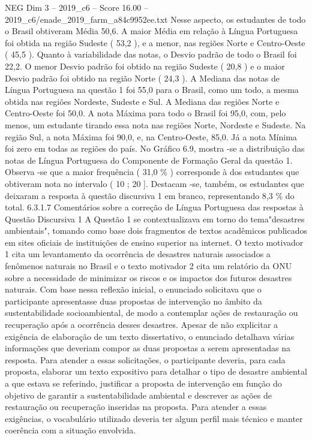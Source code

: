 \begin{textsample}{NEG Dim 3 – 2019\_c6 – Score 16.00 – 2019\_c6/enade\_2019\_farm\_a84c9952ee.txt}
Nesse aspecto, os estudantes de todo o Brasil obtiveram Média 50,6.
A maior Média em relação à Língua Portuguesa foi obtida na região Sudeste ( 53,2 ), e a menor, nas regiões Norte e Centro-Oeste ( 45,5 ).
Quanto à variabilidade das notas, o Desvio padrão de todo o Brasil foi 22,2.
O menor Desvio padrão foi obtido na região Sudeste ( 20,8 ) e o maior Desvio padrão foi obtido na região Norte ( 24,3 ).
A Mediana das notas de Língua Portuguesa na questão 1 foi 55,0 para o Brasil, como um todo, a mesma obtida nas regiões Nordeste, Sudeste e Sul.
A Mediana das regiões Norte e Centro-Oeste foi 50,0.
A nota Máxima para todo o Brasil foi 95,0, com, pelo menos, um estudante tirando essa nota nas regiões Norte, Nordeste e Sudeste.
Na região Sul, a nota Máxima foi 90,0, e, na Centro-Oeste, 85,0.
Já a nota Mínima foi zero em todas as regiões do país.
No Gráfico 6.9, mostra -se a distribuição das notas de Língua Portuguesa do Componente de Formação Geral da questão 1.
Observa -se que a maior frequência ( 31,0 \% ) corresponde à dos estudantes que obtiveram nota no intervalo ( 10 ; 20 ].
Destacam -se, também, os estudantes que deixaram a resposta à questão discursiva 1 em branco, representando 8,3 \% do total. 6.3.1.7 Comentários sobre a correção de Língua Portuguesa das respostas à Questão Discursiva 1 A Questão 1 se contextualizava em torno do tema"desastres ambientais", tomando como base dois fragmentos de textos acadêmicos publicados em sites oficiais de instituições de ensino superior na internet.
O texto motivador 1 cita um levantamento da ocorrência de desastres naturais associados a fenômenos naturais no Brasil e o texto motivador 2 cita um relatório da ONU sobre a necessidade de minimizar os riscos e os impactos dos futuros desastres naturais.
Com base nessa reflexão inicial, o enunciado solicitava que o participante apresentasse duas propostas de intervenção no âmbito da sustentabilidade socioambiental, de modo a contemplar ações de restauração ou recuperação após a ocorrência desses desastres.
Apesar de não explicitar a exigência de elaboração de um texto dissertativo, o enunciado detalhava várias informações que deveriam compor as duas propostas a serem apresentadas na resposta.
Para atender a essas solicitações, o participante deveria, para cada proposta, elaborar um texto expositivo para detalhar o tipo de desastre ambiental a que estava se referindo, justificar a proposta de intervenção em função do objetivo de garantir a sustentabilidade ambiental e descrever as ações de restauração ou recuperação inseridas na proposta.
Para atender a essas exigências, o vocabulário utilizado deveria ter algum perfil mais técnico e manter coerência com a situação envolvida.

\end{textsample}
